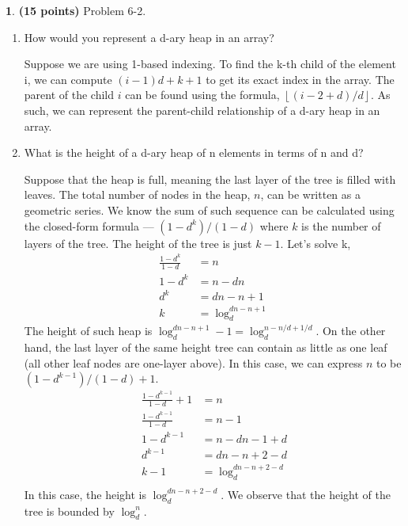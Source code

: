 \documentclass[11pt]{article}
\newcommand{\floor}[1]{\left\lfloor #1 \right\rfloor}
\theoremstyle{definition}
\theoremstyle{theorem}
\newtheorem{prob}{}
\newcommand{\solution}{\medskip\noindent{\color{DarkBlue}\textbf{Solution:}}}
\begin{document}
\newpage
\begin{prob} \textbf{(15 points)} Problem 6-2.

\begin{enumerate}
\item How would you represent a d-ary heap in an array?

\solution

Suppose we are using 1-based indexing. To find the k-th child of the element i, we can compute $(i-1)d + k +1$ to get its exact index in the array. The parent of the child $i$ can be found using the formula, $\floor{(i-2+d)/d}$. As such, we can represent the parent-child relationship of a d-ary heap in an array.

\item What is the height of a d-ary heap of n elements in terms of n and d?

\solution

Suppose that the heap is full, meaning the last layer of the tree is filled with leaves. The total number of nodes in the heap, $n$, can be written as a geometric series. We know the sum of such sequence can be calculated using the closed-form formula --- $(1-d^k) / (1-d)$ where $k$ is the number of layers of the tree. The height of the tree is just $k-1$. Let's solve k,
\[
\begin{split}
\frac{1-d^k}{1-d} &= n \\
1-d^k &= n - dn \\
d^k &= dn - n + 1 \\
k &= \log_d^{dn - n + 1}
\end{split}
\]
The height of such heap is $\log_d^{dn - n + 1} - 1 = \log_d^{n - n/d + 1/d}$. On the other hand, the last layer of the same height tree can contain as little as one leaf (all other leaf nodes are one-layer above). In this case, we can express $n$ to be $(1-d^{k-1})/(1-d) + 1$.
\[
\begin{split}
\frac{1- d^{k-1}}{1-d} + 1 &= n \\
\frac{1- d^{k-1}}{1-d} &= n - 1 \\
1 - d^{k-1} &= n - dn - 1 + d \\
d^{k-1} &= dn - n + 2 - d \\
k-1 &= \log_d^{dn - n + 2 - d} \\
\end{split}
\]
In this case, the height is $\log_d^{dn - n + 2 - d}$. We observe that the height of the tree is bounded by $\log_d^n$.


\end{enumerate}
\end{prob}
\end{document}
